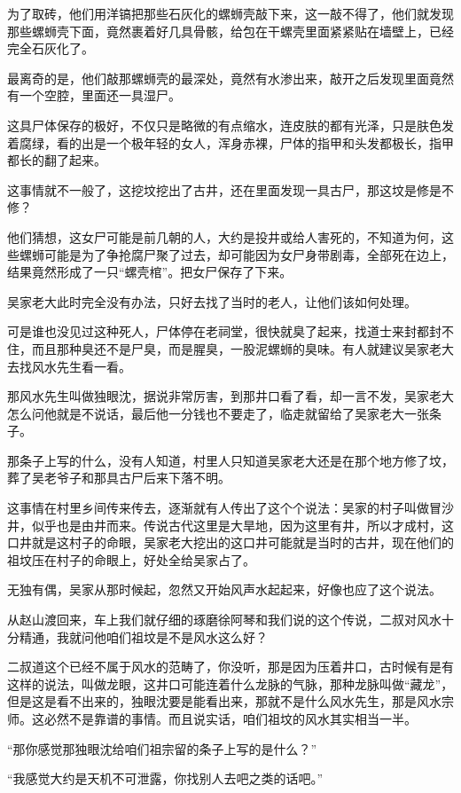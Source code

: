 为了取砖，他们用洋镐把那些石灰化的螺蛳壳敲下来，这一敲不得了，他们就发现那些螺蛳壳下面，竟然裹着好几具骨骸，给包在干螺壳里面紧紧贴在墙壁上，已经完全石灰化了。

最离奇的是，他们敲那螺蛳壳的最深处，竟然有水渗出来，敲开之后发现里面竟然有一个空腔，里面还一具湿尸。

这具尸体保存的极好，不仅只是略微的有点缩水，连皮肤的都有光泽，只是肤色发着腐绿，看的出是一个极年轻的女人，浑身赤裸，尸体的指甲和头发都极长，指甲都长的翻了起来。

这事情就不一般了，这挖坟挖出了古井，还在里面发现一具古尸，那这坟是修是不修？

他们猜想，这女尸可能是前几朝的人，大约是投井或给人害死的，不知道为何，这些螺蛳可能是为了争抢腐尸聚了过去，却可能因为女尸身带剧毒，全部死在边上，结果竟然形成了一只“螺壳棺”。把女尸保存了下来。

吴家老大此时完全没有办法，只好去找了当时的老人，让他们该如何处理。

可是谁也没见过这种死人，尸体停在老祠堂，很快就臭了起来，找道士来封都封不住，而且那种臭还不是尸臭，而是腥臭，一股泥螺蛳的臭味。有人就建议吴家老大去找风水先生看一看。

那风水先生叫做独眼沈，据说非常厉害，到那井口看了看，却一言不发，吴家老大怎么问他就是不说话，最后他一分钱也不要走了，临走就留给了吴家老大一张条子。

那条子上写的什么，没有人知道，村里人只知道吴家老大还是在那个地方修了坟，葬了吴老爷子和那具古尸后来下落不明。

这事情在村里乡间传来传去，逐渐就有人传出了这个个说法：吴家的村子叫做冒沙井，似乎也是由井而来。传说古代这里是大旱地，因为这里有井，所以才成村，这口井就是这村子的命眼，吴家老大挖出的这口井可能就是当时的古井，现在他们的祖坟压在村子的命眼上，好处全给吴家占了。

无独有偶，吴家从那时候起，忽然又开始风声水起起来，好像也应了这个说法。

从赵山渡回来，车上我们就仔细的琢磨徐阿琴和我们说的这个传说，二叔对风水十分精通，我就问他咱们祖坟是不是风水这么好？

二叔道这个已经不属于风水的范畴了，你没听，那是因为压着井口，古时候有是有这样的说法，叫做龙眼，这井口可能连着什么龙脉的气脉，那种龙脉叫做“藏龙”，但是这是看不出来的，独眼沈要是能看出来，那就不是什么风水先生，那是风水宗师。这必然不是靠谱的事情。而且说实话，咱们祖坟的风水其实相当一半。

“那你感觉那独眼沈给咱们祖宗留的条子上写的是什么？”

“我感觉大约是天机不可泄露，你找别人去吧之类的话吧。”

